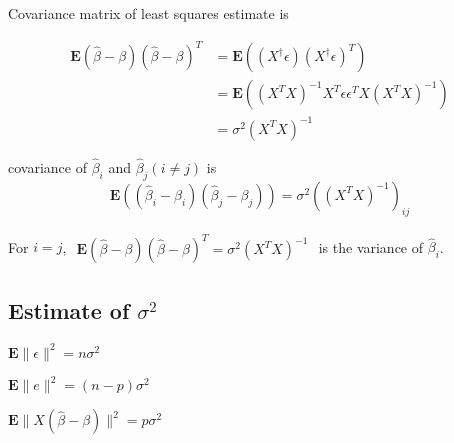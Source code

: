 \begin{theorem}
    Covariance matrix of least squares estimate is

\begin{equation}
\begin{aligned}
\mathbf{E}(\hat{\beta}-\beta)(\hat{\beta}-\beta)^{T} &=\mathbf{E}\left(\left(X^{\dagger} \epsilon\right)\left(X^{\dagger} \epsilon\right)^{T}\right) \\
&=\mathbf{E}\left(\left(X^{T} X\right)^{-1} X^{T} \epsilon \epsilon^{T} X\left(X^{T} X\right)^{-1}\right) \\
&=\sigma^{2}\left(X^{T} X\right)^{-1}
\end{aligned}
\end{equation}
\end{theorem}

\begin{theorem}
    covariance of $ \hat{\beta}_{i} $ and $ \hat{\beta}_{j}(i \neq j) $ is
\begin{equation}
\mathbf{E}\left(\left(\hat{\beta}_{i}-\beta_{i}\right)\left(\hat{\beta}_{j}-\beta_{j}\right)\right)=\sigma^{2}\left(\left(X^{T} X\right)^{-1}\right)_{i j}
\end{equation}
\end{theorem}

\begin{corollary}
    For $ i=j $, $
    \begin{aligned}
    \mathbf{E}(\hat{\beta}-\beta)(\hat{\beta}-\beta)^{T} =\sigma^{2}\left(X^{T} X\right)^{-1}
    \end{aligned}
    $ is the variance of $ \hat{\beta}_{i} $.
\end{corollary}



\subsection{Estimate of $ \sigma^{2} $}


\begin{theorem}
    $ \mathbf{E}\|\epsilon\|^{2}=n \sigma^{2} $
\end{theorem}

\begin{theorem}
    $ \mathbf{E}\|e\|^{2}=(n-p) \sigma^{2} $
\end{theorem}

\begin{theorem}
    $ \mathbf{E}\|X(\hat{\beta}-\beta)\|^{2}=p \sigma^{2} $
\end{theorem}

